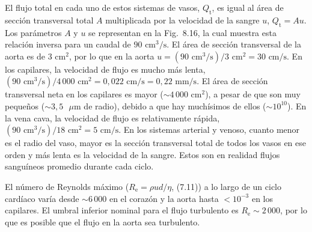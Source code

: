 \documentclass[12pt]{book}
\begin{document}
El flujo total en cada uno de estos sistemas de vasos, $Q_{\text{t}}$, es igual al área de sección transversal total $A$ multiplicada por la velocidad de la sangre $u$, $Q_{\text{t}} = A u$. Los parámetros $A$ y $u$ se representan en la Fig.~8.16, la cual muestra esta relación inversa para un caudal de $90\text{ cm}^3\text{/s}$. El área de sección transversal de la aorta es de $3\text{ cm}^2$, por lo que en la aorta $u = (90\text{ cm}^3\text{/s})/3\text{ cm}^2 = 30\text{ cm/s}$. En los capilares, la velocidad de flujo es mucho más lenta, $(90\text{ cm}^3\text{/s})/4\,000\text{ cm}^2 = 0{,}022\text{ cm/s} = 0{,}22\text{ mm/s}$. El área de sección transversal neta en los capilares es mayor (${\sim}4\,000\text{ cm}^2$), a pesar de que son muy pequeños (${\sim}3{,}5\text{ }\mu\text{m}$ de radio), debido a que hay muchísimos de ellos (${\sim}10^{10}$). En la vena cava, la velocidad de flujo es relativamente rápida, $(90\text{ cm}^3\text{/s})/18\text{ cm}^2 = 5\text{ cm/s}$. En los sistemas arterial y venoso, cuanto menor es el radio del vaso, mayor es la sección transversal total de todos los vasos en ese orden y más lenta es la velocidad de la sangre. Estos son en realidad flujos sanguíneos promedio durante cada ciclo.

El número de Reynolds máximo ($R_{\text{e}} = \rho u d/\eta$, (7.11)) a lo largo de un ciclo cardíaco varía desde ${\sim}6\,000$ en el corazón y la aorta hasta $<10^{-3}$ en los capilares. El umbral inferior nominal para el flujo turbulento es $R_{\text{e}} \sim 2\,000$, por lo que es posible que el flujo en la aorta sea turbulento.
\end{document}
